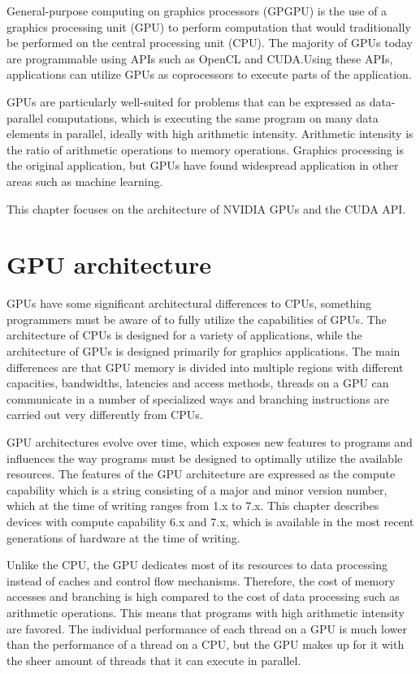 General-purpose computing on graphics processors (GPGPU) is the use of a graphics processing unit (GPU) to perform computation that would traditionally be performed on the central processing unit (CPU). The majority of GPUs today are programmable using APIs such as OpenCL and CUDA.\@ Using these APIs, applications can utilize GPUs as coprocessors to execute parts of the application.

GPUs are particularly well-suited for problems that can be expressed as data-parallel computations, which is executing the same program on many data elements in parallel, ideally with high arithmetic intensity. Arithmetic intensity is the ratio of arithmetic operations to memory operations. Graphics processing is the original application, but GPUs have found widespread application in other areas such as machine learning.

This chapter focuses on the architecture of NVIDIA GPUs and the CUDA API.\@

\section{GPU architecture}

GPUs have some significant architectural differences to CPUs, something programmers must be aware of to fully utilize the capabilities of GPUs. The architecture of CPUs is designed for a variety of applications, while the architecture of GPUs is designed primarily for graphics applications. The main differences are that GPU memory is divided into multiple regions with different capacities, bandwidths, latencies and access methods, threads on a GPU can communicate in a number of specialized ways and branching instructions are carried out very differently from CPUs.

GPU architectures evolve over time, which exposes new features to programs and influences the way programs must be designed to optimally utilize the available resources. The features of the GPU architecture are expressed as the compute capability which is a string consisting of a major and minor version number, which at the time of writing ranges from 1.x to 7.x. This chapter describes devices with compute capability 6.x and 7.x, which is available in the most recent generations of hardware at the time of writing.

Unlike the CPU, the GPU dedicates most of its resources to data processing instead of caches and control flow mechanisms. Therefore, the cost of memory accesses and branching is high compared to the cost of data processing such as arithmetic operations. This means that programs with high arithmetic intensity are favored. The individual performance of each thread on a GPU is much lower than the performance of a thread on a CPU, but the GPU makes up for it with the sheer amount of threads that it can execute in parallel.

